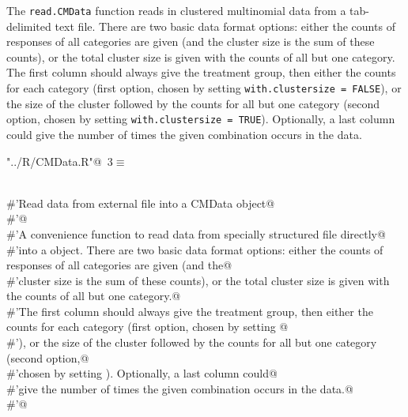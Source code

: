 \documentclass[reqno]{amsart}
\renewcommand{\NWtarget}[2]{\hypertarget{#1}{#2}}
\begin{document}
The \texttt{read.CMData} function reads in clustered multinomial data from a tab-delimited
text file. There are two basic data format options:  either the counts of responses of all categories are given (and the
cluster size is the sum of these counts), or  the total cluster size is given with the counts of all but one category.
The first column should always give the treatment group, then either the counts for each category (first option, chosen by setting 
\texttt{with.clustersize = FALSE}), or the size of the cluster followed by the counts for all but one category (second option,
chosen by setting \texttt{with.clustersize = TRUE}). Optionally, a last column could
give the number of times the given combination occurs in the data.

\begin{flushleft} \small
\begin{minipage}{\linewidth}\label{scrap3}\raggedright\small
\NWtarget{nuweb3}{} \verb@"../R/CMData.R"@\nobreak\ {\footnotesize {3}}$\equiv$
\vspace{-1ex}
\begin{list}{}{} \item
\mbox{}\verb@@\\
\mbox{}\verb@#'Read data from external file into a CMData object@\\
\mbox{}\verb@#'@\\
\mbox{}\verb@#'A convenience function to read data from specially structured file directly@\\
\mbox{}\verb@#'into a  object. There are two basic data format options:  either the counts of responses of all categories are given (and the@\\
\mbox{}\verb@#'cluster size is the sum of these counts), or  the total cluster size is given with the counts of all but one category.@\\
\mbox{}\verb@#'The first column should always give the treatment group, then either the counts for each category (first option, chosen by setting @\\
\mbox{}\verb@#'), or the size of the cluster followed by the counts for all but one category (second option,@\\
\mbox{}\verb@#'chosen by setting ). Optionally, a last column could@\\
\mbox{}\verb@#'give the number of times the given combination occurs in the data.@\\
\mbox{}\verb@#'@\\

\end{list}
\end{minipage}
\end{flushleft}
\end{document}
